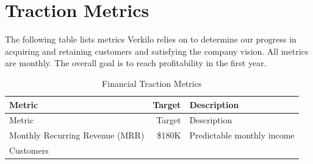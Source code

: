 \documentclass[11pt,openany]{book}
\begin{document}
\hypertarget{traction-metrics}{%
\section{Traction Metrics}\label{traction-metrics}}

The following table lists metrics Verkilo relies on to determine our
progress in acquiring and retaining customers and satisfying the company
vision. All metrics are monthly. The overall goal is to reach
profitability in the first year.

\begin{longtable}[]{@{}lrl@{}}
\caption{Financial Traction Metrics}\tabularnewline
\toprule
\begin{minipage}[b]{0.35\columnwidth}\raggedright
Metric\strut
\end{minipage} & \begin{minipage}[b]{0.08\columnwidth}\raggedleft
Target\strut
\end{minipage} & \begin{minipage}[b]{0.48\columnwidth}\raggedright
Description\strut
\end{minipage}\tabularnewline
\midrule
\endfirsthead
\toprule
\begin{minipage}[b]{0.35\columnwidth}\raggedright
Metric\strut
\end{minipage} & \begin{minipage}[b]{0.08\columnwidth}\raggedleft
Target\strut
\end{minipage} & \begin{minipage}[b]{0.48\columnwidth}\raggedright
Description\strut
\end{minipage}\tabularnewline
\midrule
\endhead
\begin{minipage}[t]{0.35\columnwidth}\raggedright
Monthly Recurring Revenue (MRR)\strut
\end{minipage} & \begin{minipage}[t]{0.08\columnwidth}\raggedleft
\$180K\strut
\end{minipage} & \begin{minipage}[t]{0.48\columnwidth}\raggedright
Predictable monthly income\strut
\end{minipage}\tabularnewline
\begin{minipage}[t]{0.35\columnwidth}\raggedright
Customers\strut
\end{minipage} & \begin{minipage}[t]{0.08\columnwidth}\raggedleft
2250\strut
\end{minipage} & \begin{minipage}[t]{0.48\columnwidth}\raggedright

\end{minipage}
\end{longtable}
\end{document}
